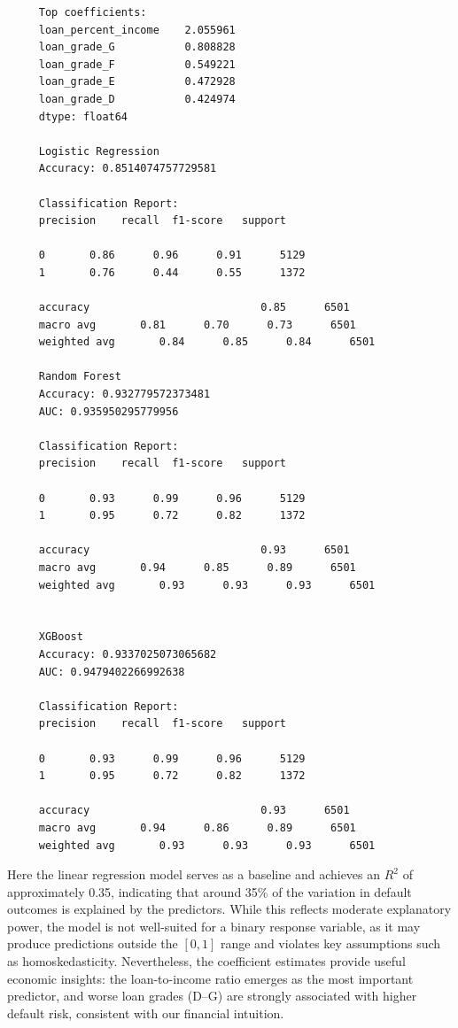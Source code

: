 \documentclass[letterpaper]{article}
\begin{document}
\begin{minipage}{\linewidth}
	\begin{Verbatim}
     Top coefficients:
     loan_percent_income    2.055961
     loan_grade_G           0.808828
     loan_grade_F           0.549221
     loan_grade_E           0.472928
     loan_grade_D           0.424974
     dtype: float64
     
     Logistic Regression
     Accuracy: 0.8514074757729581
     
     Classification Report:
     precision    recall  f1-score   support
     
     0       0.86      0.96      0.91      5129
     1       0.76      0.44      0.55      1372
     
     accuracy                           0.85      6501
     macro avg       0.81      0.70      0.73      6501
     weighted avg       0.84      0.85      0.84      6501
     
     Random Forest
     Accuracy: 0.932779572373481
     AUC: 0.935950295779956
     
     Classification Report:
     precision    recall  f1-score   support
     
     0       0.93      0.99      0.96      5129
     1       0.95      0.72      0.82      1372
     
     accuracy                           0.93      6501
     macro avg       0.94      0.85      0.89      6501
     weighted avg       0.93      0.93      0.93      6501
     
     
     XGBoost
     Accuracy: 0.9337025073065682
     AUC: 0.9479402266992638
     
     Classification Report:
     precision    recall  f1-score   support
     
     0       0.93      0.99      0.96      5129
     1       0.95      0.72      0.82      1372
     
     accuracy                           0.93      6501
     macro avg       0.94      0.86      0.89      6501
     weighted avg       0.93      0.93      0.93      6501
	\end{Verbatim}
\end{minipage}

Here the linear regression model serves as a baseline and achieves an $R^2$ of approximately 0.35, indicating that around 35\% of the variation in default outcomes is explained by the predictors. While this reflects moderate explanatory power, the model is not well-suited for a binary response variable, as it may produce predictions outside the $[0,1]$ range and violates key assumptions such as homoskedasticity. Nevertheless, the coefficient estimates provide useful economic insights: the loan-to-income ratio emerges as the most important predictor, and worse loan grades (D–G) are strongly associated with higher default risk, consistent with our financial intuition.
\end{document}
